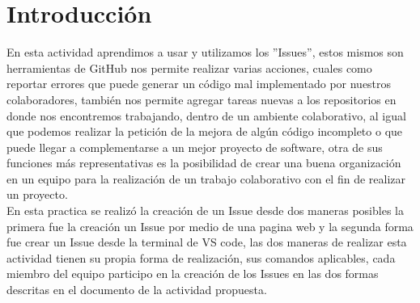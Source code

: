 
\section{Introducción}
En esta actividad aprendimos a usar y utilizamos los ''Issues'', estos mismos son herramientas de GitHub nos permite realizar varias acciones, cuales como reportar errores que puede generar un código mal implementado por nuestros colaboradores, también nos permite agregar tareas nuevas a los repositorios en donde nos encontremos trabajando, dentro de un ambiente colaborativo, al igual que podemos realizar la petición de la mejora de algún código incompleto o que puede llegar a complementarse a un mejor proyecto de software, otra de sus funciones más representativas es la posibilidad de crear una buena organización en un equipo para la realización de un trabajo colaborativo con el fin de realizar un proyecto.
\\En esta practica se realizó la creación de un Issue desde dos maneras posibles la primera fue la creación un Issue por medio de una pagina web y la segunda forma fue crear un Issue desde la terminal de VS code, las dos maneras de realizar esta actividad tienen su propia forma de realización, sus comandos aplicables, cada miembro del equipo participo en la creación de los Issues en las dos formas descritas en el documento de la actividad propuesta.
